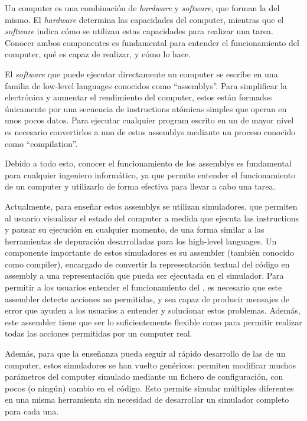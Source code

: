 Un \gls{computer} es una combinación de \textit{hardware} y \textit{software},
que forman la  del mismo. El \textit{hardware}
determina las capacidades del \gls{computer}, mientras que el \textit{software}
indica cómo se utilizan estas capacidades para realizar una tarea. Conocer ambos
componentes es fundamental para entender el funcionamiento del \gls{computer},
qué es capaz de realizar, y cómo lo hace.

El \textit{software} que puede ejecutar directamente un \gls{computer} se
escribe en una familia de \glspl{low-level language} conocidos como
``\glspl{assembly}''. Para simplificar la electrónica y aumentar el rendimiento
del \gls{computer}, estos están formados únicamente por una secuencia de
\glspl{instruction} atómicas simples que operan en unos pocos datos. Para
ejecutar cualquier \gls{program} escrito en un  de mayor nivel es necesario convertirlos a uno de estos
\glspl{assembly} mediante un proceso conocido como ``\gls{compilation}''.

Debido a todo esto, conocer el funcionamiento de los \glspl{assembly} es
fundamental para cualquier ingeniero informático, ya que permite entender el
funcionamiento de un \gls{computer} y utilizarlo de forma efectiva para llevar a
cabo una tarea.

Actualmente, para enseñar estos \glspl{assembly} se utilizan simuladores, que
permiten al usuario visualizar el estado del \gls{computer} a medida que ejecuta
las \glspl{instruction} y pausar su ejecución en cualquier momento, de una forma
similar a las herramientas de depuración desarrolladas para los
\glspl{high-level language}. Un componente importante de estos simuladores es su
\gls{assembler} (también conocido como \gls{compiler}), encargado de convertir
la representación textual del código en \gls{assembly} a una representación que
pueda ser ejecutada en el simulador. Para permitir a los usuarios entender el
funcionamiento del , es necesario que
este \gls{assembler} detecte acciones no permitidas, y sea capaz de producir
mensajes de error que ayuden a los usuarios a entender y solucionar estos
problemas. Además, este \gls{assembler} tiene que ser lo suficientemente
flexible como para permitir realizar todas las acciones permitidas por un
\gls{computer} real.

Además, para que la enseñanza pueda seguir al rápido desarrollo de las
 de un \gls{computer}, estos simuladores se han
vuelto genéricos: permiten modificar muchos parámetros del \gls{computer}
simulado mediante un fichero de configuración, con pocos (o ningún) cambio en el
código. Esto permite simular múltiples  diferentes
en una misma herramienta sin necesidad de desarrollar un simulador completo para
cada una.

